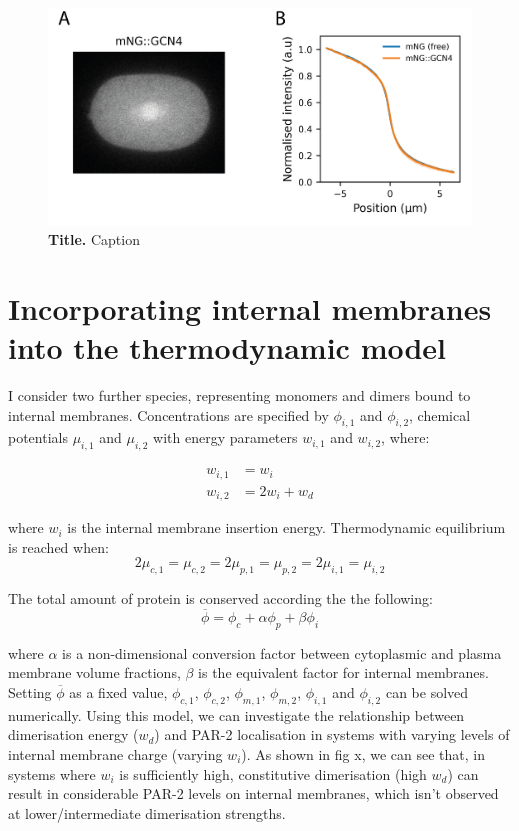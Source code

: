 \documentclass[12pt]{"report"}
\newcommand{\mycaption}[2]{\caption[#1]{\textbf{#1.} #2}}
\begin{document}
\begin{figure}[!h]
\includegraphics[scale=1]{gcn4_alone}
\setlength{\abovecaptionskip}{20pt}
\centering
\mycaption{Title}{Caption}
\label{fig:gcn4_alone}
\end{figure}

\clearpage
\section{Incorporating internal membranes into the thermodynamic model}

I consider two further species, representing monomers and dimers bound to internal membranes.  Concentrations are specified by $\phi_{i,1}$ and $\phi_{i,2}$, chemical potentials $\mu_{i,1}$ and $\mu_{i,2}$ with energy parameters $w_{i,1}$ and $w_{i,2}$, where:

\begin{align}
w_{i,1} &= w_i\\
w_{i,2} &= 2w_i + w_d
\end{align}

where $w_i$ is the internal membrane insertion energy. Thermodynamic equilibrium is reached when:
\begin{equation}
2\mu_{c,1} =  \mu_{c,2} = 2\mu_{p,1} =  \mu_{p,2} = 2\mu_{i,1} =  \mu_{i,2}
\end{equation}

The total amount of protein is conserved according the the following:
\begin{equation}
\overline{\phi} = \phi_c + \alpha\phi_p + \beta\phi_i
\end{equation}

where $\alpha$ is a non-dimensional conversion factor between cytoplasmic and plasma membrane volume fractions, $\beta$ is the equivalent factor for internal membranes. Setting $\overline{\phi}$ as a fixed value, $\phi_{c,1}$, $\phi_{c,2}$, $\phi_{m,1}$, $\phi_{m,2}$, $\phi_{i,1}$ and $\phi_{i,2}$ can be solved numerically. Using this model, we can investigate the relationship between dimerisation energy ($w_d$) and PAR-2 localisation in systems with varying levels of internal membrane charge (varying $w_i$). As shown in fig x, we can see that, in systems where $w_i$ is sufficiently high, constitutive dimerisation (high $w_d$) can result in considerable PAR-2 levels on internal membranes, which isn't observed at lower/intermediate dimerisation strengths. 
\end{document}
